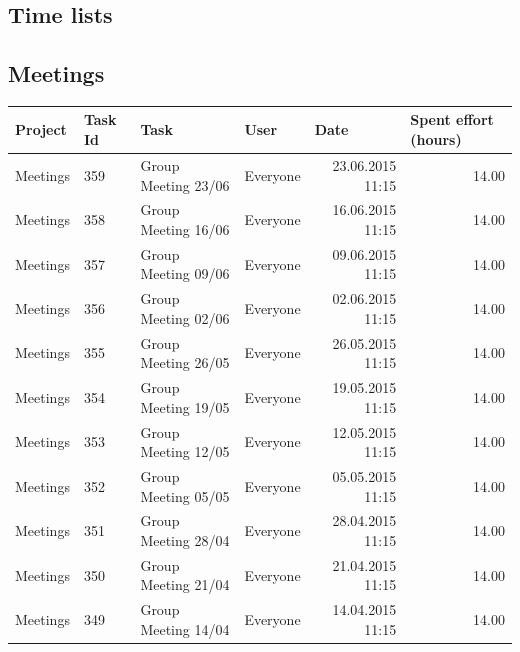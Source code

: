 \documentclass[a4paper]{article}
\begin{document}
\begin{landscape}
\section{Time lists}

\subsection{Meetings}
\begin{center}
\begin{tabular}{|l|l|l|l|l|l|}
\hline
\textbf{Project} & \textbf{Task Id} & \textbf{Task}  & \textbf{User} & \textbf{Date} & \textbf{Spent effort (hours)} \\ \hline
Meetings &  359 & Group Meeting 23/06 & Everyone & \multicolumn{1}{r|}{23.06.2015 11:15} & \multicolumn{1}{r|}{14.00} \\ \hline
Meetings &  358 & Group Meeting 16/06 & Everyone & \multicolumn{1}{r|}{16.06.2015 11:15} & \multicolumn{1}{r|}{14.00} \\ \hline
Meetings &  357 & Group Meeting 09/06 & Everyone & \multicolumn{1}{r|}{09.06.2015 11:15} & \multicolumn{1}{r|}{14.00} \\ \hline
Meetings &  356 & Group Meeting 02/06 & Everyone & \multicolumn{1}{r|}{02.06.2015 11:15} & \multicolumn{1}{r|}{14.00} \\ \hline
Meetings &  355 & Group Meeting 26/05 & Everyone & \multicolumn{1}{r|}{26.05.2015 11:15} & \multicolumn{1}{r|}{14.00} \\ \hline
Meetings &  354 & Group Meeting 19/05 & Everyone & \multicolumn{1}{r|}{19.05.2015 11:15} & \multicolumn{1}{r|}{14.00} \\ \hline
Meetings &  353 & Group Meeting 12/05 & Everyone & \multicolumn{1}{r|}{12.05.2015 11:15} & \multicolumn{1}{r|}{14.00} \\ \hline
Meetings &  352 & Group Meeting 05/05 & Everyone & \multicolumn{1}{r|}{05.05.2015 11:15} & \multicolumn{1}{r|}{14.00} \\ \hline
Meetings &  351 & Group Meeting 28/04 & Everyone & \multicolumn{1}{r|}{28.04.2015 11:15} & \multicolumn{1}{r|}{14.00} \\ \hline
Meetings &  350 & Group Meeting 21/04 & Everyone & \multicolumn{1}{r|}{21.04.2015 11:15} & \multicolumn{1}{r|}{14.00} \\ \hline
Meetings &  349 & Group Meeting 14/04 & Everyone & \multicolumn{1}{r|}{14.04.2015 11:15} & \multicolumn{1}{r|}{14.00} \\ \hline

\end{tabular}
\end{center}
\end{landscape}
\end{document}
